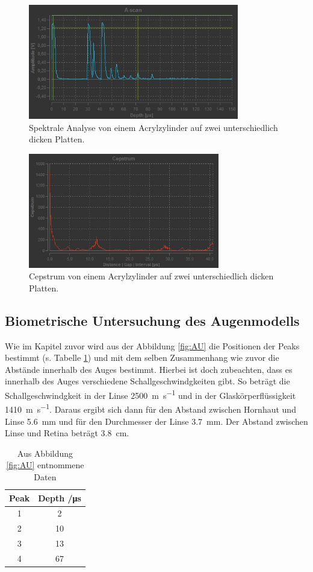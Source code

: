 \begin{figure}
  \centering
  \includegraphics[height = 5cm]{FFS-Data/a_scan_spektrale_analyse.jpg}
  \caption{Spektrale Analyse von einem Acrylzylinder auf zwei unterschiedlich dicken Platten.}
  \label{fig:SA}
\end{figure}
\begin{figure}
  \centering
  \includegraphics[height = 5cm]{FFS-Data/cepstrum_spektrale_analyse.jpg}
  \caption{Cepstrum von einem Acrylzylinder auf zwei unterschiedlich dicken Platten.}
  \label{fig:SAC}
\end{figure}
\subsection{Biometrische Untersuchung des Augenmodells}
Wie im Kapitel zuvor wird aus der Abbildung \ref{fig:AU} die Positionen der
Peaks bestimmt (s. Tabelle \ref{tab:AU}) und mit dem selben Zusammenhang wie zuvor die Abstände innerhalb
des Auges bestimmt. Hierbei ist doch zubeachten, dass es innerhalb des Auges
verschiedene Schallgeschwindgkeiten gibt. So beträgt die Schallgeschwindgkeit
in der Linse \SI{2500}{\meter\per\second} und in der Glaskörperflüssigkeit
\SI{1410}{\meter \per \second}.
Daraus ergibt sich dann für den Abstand zwischen Hornhaut und Linse
\SI{5.6}{\milli\meter} und für den Durchmesser der Linse \SI{3.7}{\milli\meter}.
Der Abstand zwischen Linse und Retina beträgt \SI{3.8}{\centi\meter}.

\begin{table}
  \centering
  \caption{Aus Abbildung \ref{fig:AU} entnommene Daten}
  \begin{tabular}{c c}
  \toprule
  Peak & Depth /\si{\micro \second} \\
  \midrule
  1 & 2 \\
  2 & 10 \\
  3 & 13 \\
  4 & 67 \\
  \bottomrule
\end{tabular}
\label{tab:AU}
\end{table}

